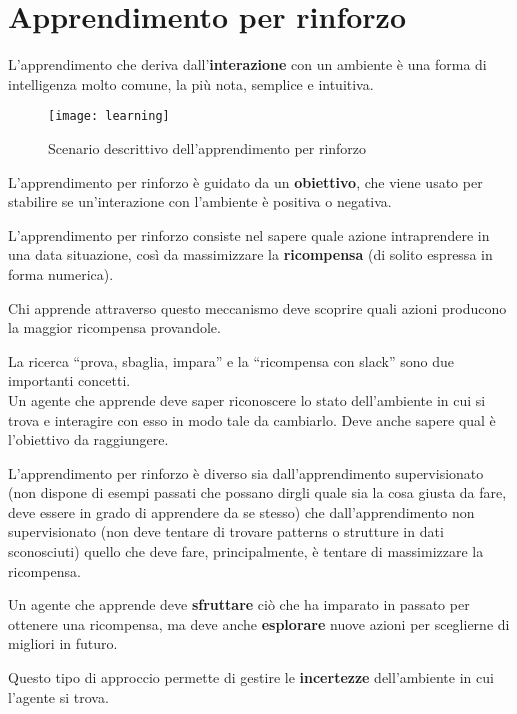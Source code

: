 \newpage
\section{Apprendimento per rinforzo}

L'apprendimento che deriva dall'\textbf{interazione} con un ambiente è una
forma di intelligenza molto comune, la più nota, semplice e intuitiva.

\begin{figure}[H]
\caption{Scenario descrittivo dell'apprendimento per rinforzo}
\centering
\texttt{[image: learning]}
\end{figure}

L'apprendimento per rinforzo è guidato da un \textbf{obiettivo}, che viene
usato per stabilire se un'interazione con l'ambiente è positiva o negativa.

L'apprendimento per rinforzo consiste nel sapere quale azione intraprendere in
una data situazione, così da massimizzare la \textbf{ricompensa} (di solito
espressa in forma numerica).

Chi apprende attraverso questo meccanismo deve scoprire quali azioni producono
la maggior ricompensa provandole.

La ricerca ``prova, sbaglia, impara'' e la ``ricompensa con slack'' sono due
importanti concetti.\\

Un agente che apprende deve saper riconoscere lo stato dell'ambiente in cui si trova
e interagire con esso in modo tale da cambiarlo. Deve anche sapere qual è
l'obiettivo da raggiungere.

L'apprendimento per rinforzo è diverso sia dall'apprendimento supervisionato (non
dispone di esempi passati che possano dirgli quale sia la cosa giusta da fare, deve
essere in grado di apprendere da se stesso) che dall'apprendimento non supervisionato
(non deve tentare di trovare patterns o strutture in dati sconosciuti) quello che
deve fare, principalmente, è tentare di massimizzare la ricompensa.

Un agente che apprende deve \textbf{sfruttare} ciò che ha imparato in passato per ottenere una
ricompensa, ma deve anche \textbf{esplorare} nuove azioni per sceglierne di migliori in futuro.

Questo tipo di approccio permette di gestire le \textbf{incertezze} dell'ambiente in
cui l'agente si trova.
